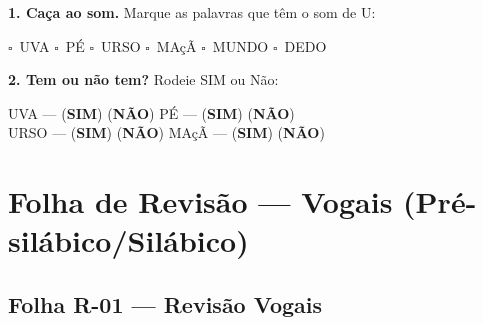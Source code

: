 \begin{somletra}[title={\faMusic~Atividade de Som da Vogal --- B\^onus (n\~ao vale nota)}]
\textbf{1. Ca\c{c}a ao som.} Marque as palavras que t\^e{}m o som de U:
\begin{center}
$\square$~UVA \quad $\square$~P\'E \quad $\square$~URSO \quad $\square$~MA\c{c}\~A \quad $\square$~MUNDO \quad $\square$~DEDO
\end{center}

\textbf{2. Tem ou n\~ao{} tem?} Rodeie SIM ou N\~ao:
\begin{center}
UVA --- (\textbf{SIM}) (\textbf{N\~AO}) \quad P\'E --- (\textbf{SIM}) (\textbf{N\~AO}) \\ URSO --- (\textbf{SIM}) (\textbf{N\~AO}) \quad MA\c{c}\~A --- (\textbf{SIM}) (\textbf{N\~AO})
\end{center}
\end{somletra}



\section{Folha de Revisão --- Vogais (Pré-silábico/Silábico)}


\subsection{Folha R-01 --- Revisão Vogais}

